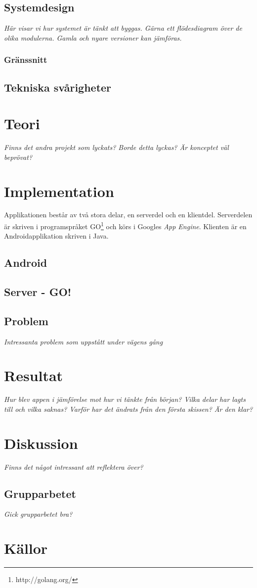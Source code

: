 \documentclass[12pt,a4paper]{article}
\begin{document}
\subsection{Systemdesign}
\textit{Här visar vi hur systemet är tänkt att byggas. Gärna ett flödesdiagram över de olika modulerna. Gamla och nyare versioner kan jämföras.}
\subsubsection{Gränssnitt}

\subsection{Tekniska svårigheter}

\section{Teori}
\textit{Finns det andra projekt som lyckats? Borde detta lyckas? Är konceptet väl beprövat?}
\section{Implementation}
Applikationen består av två stora delar, en serverdel och en klientdel. Serverdelen är skriven i programspråket GO\footnote{http://golang.org/} och körs i Googles \textit{App Engine}. Klienten är en Androidapplikation skriven i Java.
\subsection{Android}
\subsection{Server - GO!}
\subsection{Problem}
\textit{Intressanta problem som uppstått under vägens gång}
\section{Resultat}
\textit{Hur blev appen i jämförelse mot hur vi tänkte från början? Vilka delar har lagts till och vilka saknas? Varför har det ändrats från den första skissen? Är den klar?}
\section{Diskussion}
\textit{Finns det något intressant att reflektera över?}
\subsection{Grupparbetet}
\textit{Gick grupparbetet bra?}
\section{Källor}
\appendix
\end{document}
